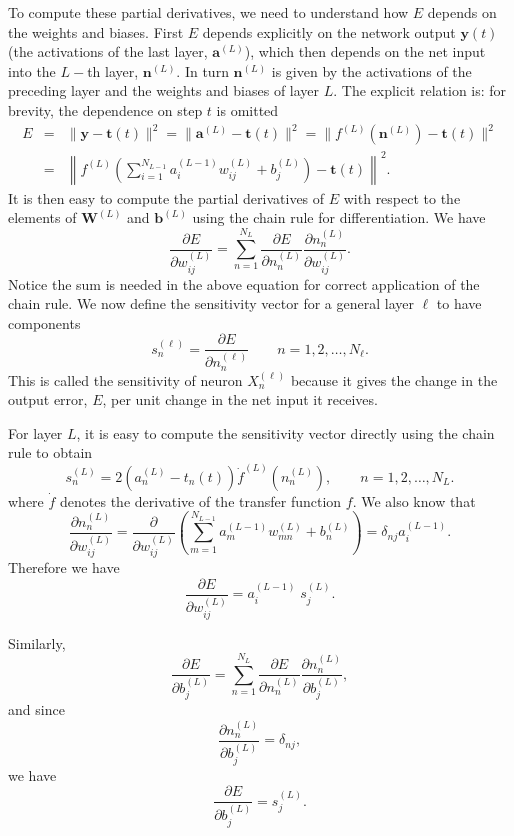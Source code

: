 \documentclass[fleqn]{article}
\begin{document}
To compute these partial derivatives, we need to understand how $E$ depends on the weights and biases.
First $E$ depends explicitly on the network output $\mathbf y(t)$
(the activations of the last layer, $\mathbf a^{(L)}$),
which then depends on the net input into the $L-$th layer, $\mathbf n^{(L)}$.
In turn $\mathbf n^{(L)}$
is given by the activations of the preceding layer and the weights and biases of layer $L$.
The explicit relation is: for brevity, the dependence on step $t$ is omitted
\begin{eqnarray*}
E & = & \| \mathbf y - \mathbf t(t) \|^2 = \| \mathbf a^{(L)} - \mathbf t(t) \|^2 =
\| f^{(L)}(\mathbf n^{(L)}) - \mathbf t(t) \|^2 \\
& = &
\left\| f^{(L)} \left(\sum_{i=1}^{N_{L-1}} a_i^{(L-1)} w_{ij}^{(L)} + b_j^{(L)} \right) - \mathbf t(t) \right\|^2.
\end{eqnarray*}
It is then easy to compute the partial derivatives of $E$ with respect to the elements of
$\mathbf W^{(L)}$ and $\mathbf b^{(L)}$ using the chain rule for differentiation.
We have
\[
\frac{\partial E}{\partial w_{ij}^{(L)}} = \sum_{n=1}^{N_L} \frac{\partial E}{\partial n_{n}^{(L)}}
\frac{\partial n_{n}^{(L)}}{\partial w_{ij}^{(L)}}.
\]
Notice the sum is needed in the above equation for correct application of the chain rule.
We now define the sensitivity vector for a general layer $\ell$ to have components
\[
s_{n}^{(\ell)} = \frac{\partial E}{\partial n_{n}^{(\ell)}} \qquad n=1, 2, \ldots, N_\ell.
\]
This is called the sensitivity of neuron $X_n^{(\ell)}$ because it gives the change in the output error, $E$,
per unit change in the net input it receives.

For layer $L$, it is easy to compute the sensitivity vector directly using the chain rule to obtain
\[
s_{n}^{(L)} = 2 \left( a_n^{(L)} - t_n(t) \right) \dot f^{(L)}( n_n^{(L)}),
\qquad n=1, 2, \ldots, N_L.
\]
where $\dot f$ denotes the derivative of the transfer function $f$.
We also know that
\[
\frac{\partial n_{n}^{(L)}}{\partial w_{ij}^{(L)}} =
\frac{\partial}{\partial w_{ij}^{(L)}} \left(
\sum_{m=1}^{N_{L-1}} a_m^{(L-1)} w_{mn}^{(L)} + b_n^{(L)}
\right) = \delta_{nj} a_i^{(L-1)}.
\]
Therefore we have
\[
\frac{\partial E}{\partial w_{ij}^{(L)}} = a_i^{(L-1)} \; s_j^{(L)}.
\]

Similarly,
\[
\frac{\partial E}{\partial b_{j}^{(L)}} = \sum_{n=1}^{N_L} \frac{\partial E}{\partial n_{n}^{(L)}}
\frac{\partial n_{n}^{(L)}}{\partial b_{j}^{(L)}},
\]
and since
\[
\frac{\partial n_{n}^{(L)}}{\partial b_{j}^{(L)}} = \delta_{nj},
\]
we have
\[
\frac{\partial E}{\partial b_{j}^{(L)}} = s_{j}^{(L)}.
\]
\end{document}
